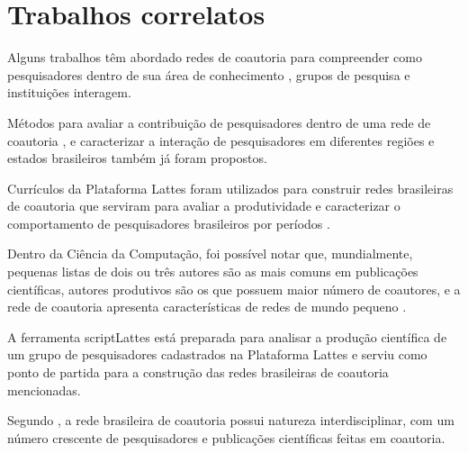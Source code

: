 \chapter[Trabalhos correlatos]{Trabalhos correlatos}

Alguns trabalhos têm abordado redes de coautoria para compreender como pesquisadores dentro de sua área de conhecimento \cite{mena2014brazilian} \cite{franceschet2011collaboration} \cite{santin2016collaboration}, grupos de pesquisa \cite{delgado2014analyzing} e instituições \cite{ioannidis2008measuring} interagem.

Métodos para avaliar a contribuição de pesquisadores dentro de uma rede de coautoria \cite{liu2005co} \cite{franceschet2011collaboration}, e caracterizar a interação de pesquisadores em diferentes regiões e estados brasileiros \cite{sidone2016ciencia} também já foram propostos.

Currículos da Plataforma Lattes foram utilizados para construir redes brasileiras de coautoria que serviram para avaliar a produtividade e caracterizar o comportamento de pesquisadores brasileiros por períodos \cite{mena2014brazilian}.

Dentro da Ciência da Computação, foi possível notar que, mundialmente, pequenas listas de dois ou três autores são as mais comuns em publicações científicas, autores produtivos são os que possuem maior número de coautores, e a rede de coautoria apresenta características de redes de mundo pequeno \cite{franceschet2011collaboration}.

A ferramenta scriptLattes \cite{mena2009scriptlattes} está preparada para analisar a produção científica de um grupo de pesquisadores cadastrados na Plataforma Lattes \cite{mena2013prospecccao} e serviu como ponto de partida para a construção das redes brasileiras de coautoria mencionadas.

Segundo , a rede brasileira de coautoria possui natureza interdisciplinar, com um número crescente de pesquisadores e publicações científicas feitas em coautoria.

